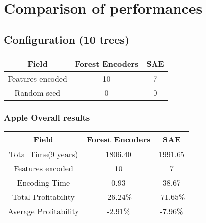 \chapter{Comparison of performances} 

\section{Configuration (10 trees)}
\begin{tabular}[b]{|c|c|c|}\hline
      Field & Forest Encoders & SAE \\ \hline
      Features encoded & 10 & 7 \\ \hline
      Random seed & 0 & 0 \\ \hline
\end{tabular}
\subsection*{Apple Overall results}
\begin{tabular}[b]{|c|c|c|}\hline
      Field & Forest Encoders & SAE \\ \hline
      Total Time(9 years) & 1806.40 & 1991.65 \\ \hline
      Features encoded & 10 & 7 \\ \hline
      Encoding Time & 0.93 & 38.67 \\ \hline
      Total Profitability & -26.24\% & -71.65\% \\ \hline
      Average Profitability & -2.91\% & -7.96\% \\ \hline
\end{tabular}
\newpage
